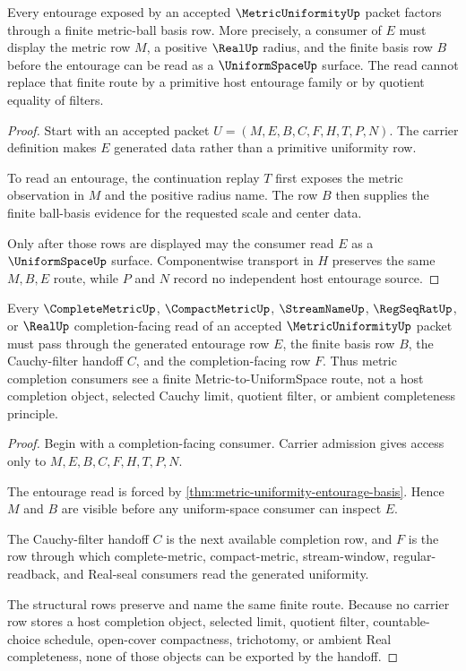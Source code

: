 \begin{theorem}
\label{thm:metric-uniformity-entourage-basis}
Every entourage exposed by an accepted $\MetricUniformityUp$ packet factors through a finite metric-ball basis row. More precisely, a consumer of $E$ must display the metric row $M$, a positive $\RealUp$ radius, and the finite basis row $B$ before the entourage can be read as a $\UniformSpaceUp$ surface. The read cannot replace that finite route by a primitive host entourage family or by quotient equality of filters.
\end{theorem}
\begin{proof}
Start with an accepted packet $U=(M,E,B,C,F,H,T,P,N)$. The carrier definition makes $E$ generated data rather than a primitive uniformity row.

To read an entourage, the continuation replay $T$ first exposes the metric observation in $M$ and the positive radius name. The row $B$ then supplies the finite ball-basis evidence for the requested scale and center data.

Only after those rows are displayed may the consumer read $E$ as a $\UniformSpaceUp$ surface. Componentwise transport in $H$ preserves the same $M,B,E$ route, while $P$ and $N$ record no independent host entourage source.
\end{proof}

\begin{theorem}
\label{thm:metric-uniformity-cauchy-filter-handoff}
Every $\CompleteMetricUp$, $\CompactMetricUp$, $\StreamNameUp$, $\RegSeqRatUp$, or $\RealUp$ completion-facing read of an accepted $\MetricUniformityUp$ packet must pass through the generated entourage row $E$, the finite basis row $B$, the Cauchy-filter handoff $C$, and the completion-facing row $F$. Thus metric completion consumers see a finite Metric-to-UniformSpace route, not a host completion object, selected Cauchy limit, quotient filter, or ambient completeness principle.
\end{theorem}
\begin{proof}
Begin with a completion-facing consumer. Carrier admission gives access only to $M,E,B,C,F,H,T,P,N$.

The entourage read is forced by \autoref{thm:metric-uniformity-entourage-basis}. Hence $M$ and $B$ are visible before any uniform-space consumer can inspect $E$.

The Cauchy-filter handoff $C$ is the next available completion row, and $F$ is the row through which complete-metric, compact-metric, stream-window, regular-readback, and Real-seal consumers read the generated uniformity.

The structural rows preserve and name the same finite route. Because no carrier row stores a host completion object, selected limit, quotient filter, countable-choice schedule, open-cover compactness, trichotomy, or ambient Real completeness, none of those objects can be exported by the handoff.
\end{proof}

